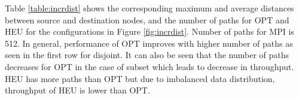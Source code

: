 Table \ref{table:incrdist} shows the corresponding maximum and average distances between source and destination nodes, and the number of paths for OPT and HEU for the configurations in Figure \ref{fig:incrdist}. Number of paths for MPI is 512. In general, performance of OPT improves with higher number of paths as seen in the first row for disjoint. It can also be seen that the number of paths decreases for OPT in the case of subset which leads to decrease in throughput. HEU has more paths than OPT but due to imbalanced data distribution, throughput of HEU is lower than OPT.  
